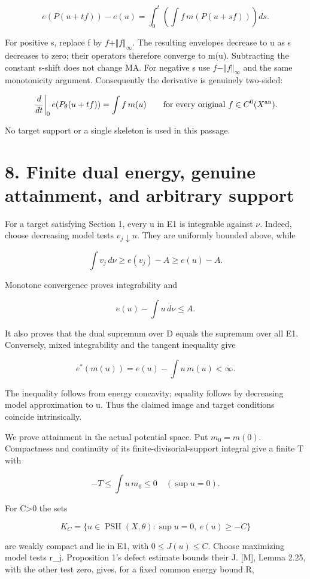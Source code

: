 \documentclass[11pt]{article}
\newcommand{\PSH}{\operatorname{PSH}}
\begin{document}
\[
e(P(u+tf))-e(u)=\int_0^t\left(\int f\,m(P(u+sf))\right)ds.
\]

For positive s, replace f by \(f+\Vert f\Vert_\infty\). The resulting envelopes decrease to u as s decreases to zero; their operators therefore converge to m(u). Subtracting the constant s-shift does not change MA. For negative s use \(f-\Vert f\Vert_\infty\) and the same monotonicity argument. Consequently the derivative is genuinely two-sided:

\[
\left.\frac{d}{dt}\right|_0 e(P_\theta(u+tf))=\int f\,m(u)
\qquad\text{for every original }f\in C^0(X^{\rm an}).
\]

No target support or a single skeleton is used in this passage.

\section*{8. Finite dual energy, genuine attainment, and arbitrary support}

For a target satisfying Section 1, every u in E1 is integrable against \(\nu\). Indeed, choose decreasing model tests \(v_j\downarrow u\). They are uniformly bounded above, while

\[
\int v_j\,d\nu\geq e(v_j)-A\geq e(u)-A.
\]

Monotone convergence proves integrability and

\[
e(u)-\int u\,d\nu\leq A.
\]

It also proves that the dual supremum over D equals the supremum over all E1. Conversely, mixed integrability and the tangent inequality give

\[
e^*(m(u))=e(u)-\int u\,m(u)<\infty.
\]

The inequality follows from energy concavity; equality follows by decreasing model approximation to u. Thus the claimed image and target conditions coincide intrinsically.

We prove attainment in the actual potential space. Put \(m_0=m(0)\). Compactness and continuity of its finite-divisorial-support integral give a finite T with

\[
-T\leq\int u\,m_0\leq0\quad(\sup u=0).
\]

For C>0 the sets

\[
K_C=\{u\in\PSH(X,\theta):\sup u=0,\ e(u)\geq-C\}
\]

are weakly compact and lie in E1, with \(0\leq J(u)\leq C\). Choose maximizing model tests r\_j. Proposition 1's defect estimate bounds their J. [M], Lemma 2.25, with the other test zero, gives, for a fixed common energy bound R,
\end{document}
